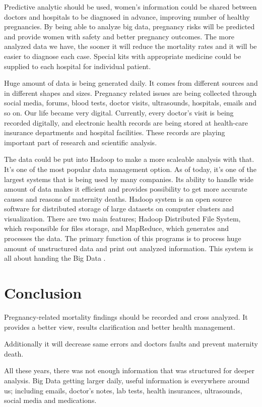 \documentclass[sigconf]{acmart}
\begin{document}
Predictive analytic should be used, women’s information could be shared between doctors and hospitals to be diagnosed in advance, improving number of healthy pregnancies. By being able to analyze big data, pregnancy risks will be predicted and provide women with safety and better pregnancy outcomes. The more analyzed data we have, the sooner it will reduce the mortality rates and it will be easier to diagnose each case. Special kits with appropriate medicine could be supplied to each hospital for individual patient.

Huge amount of data is being generated daily. It comes from different sources and in different shapes and sizes. Pregnancy related issues are being collected through social media, forums, blood tests, doctor visits, ultrasounds, hospitals, emails and so on. Our life became very digital. Currently, every doctor’s visit is being recorded digitally, and electronic health records are being stored at health-care insurance departments and hospital facilities. These records are playing important part of research and scientific analysis.

The data could be put into Hadoop to make a more scaleable analysis with that. It’s one of the most popular data management option. As of today, it's one of the largest systems that is being used by many companies. Its ability to handle wide amount of data makes it efficient and provides possibility to get more accurate causes and reasons of maternity deaths. Hadoop system is an open source software for distributed storage of large datasets on computer clusters and visualization. There are two main features;  Hadoop Distributed File System, which responsible for files storage, and MapReduce, which generates and processes the data. The primary function of this programs is to process huge amount of unstructured data and print out analyzed information. This system is all about handing the Big Data \cite{dittrich2012efficient}.

\section{Conclusion}

Pregnancy-related mortality findings should be recorded and cross analyzed. It provides a better view, results clarification and better health management. 

Additionally it will decrease same errors and doctors faults and prevent maternity death.

All these years, there was not enough information that was structured for deeper analysis. Big Data getting larger daily, useful information is everywhere around us; including emails, doctor’s notes, lab tests, health insurances, ultrasounds, social media and medications.
\end{document}
